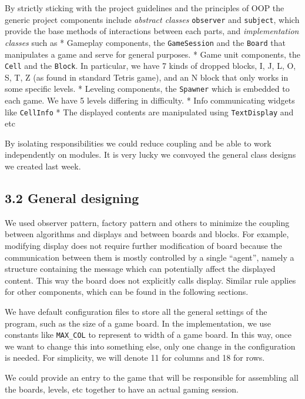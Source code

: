 \documentclass[
]{article}
\begin{document}
By strictly sticking with the project guidelines and the principles of
OOP the generic project components include \emph{abstract classes}
\texttt{observer} and \texttt{subject}, which provide the base methods
of interactions between each parts, and \emph{implementation classes}
such as * Gameplay components, the \texttt{GameSession} and the
\texttt{Board} that manipulates a game and serve for general purposes. *
Game unit components, the \texttt{Cell} and the \texttt{Block}. In
particular, we have 7 kinds of dropped blocks, I, J, L, O, S, T, Z (as
found in standard Tetris game), and an N block that only works in some
specific levels. * Leveling components, the \texttt{Spawner} which is
embedded to each game. We have 5 levels differing in difficulty. * Info
communicating widgets like \texttt{CellInfo} * The displayed contents
are manipulated using \texttt{TextDisplay} and etc

By isolating responsibilities we could reduce coupling and be able to
work independently on modules. It is very lucky we convoyed the general
class designs we created last week.

\hypertarget{general-designing}{%
\subsection{3.2 General designing}\label{general-designing}}

We used observer pattern, factory pattern and others to minimize the
coupling between algorithms and displays and between boards and blocks.
For example, modifying display does not require further modification of
board because the communication between them is mostly controlled by a
single ``agent'', namely a structure containing the message which can
potentially affect the displayed content. This way the board does not
explicitly calls display. Similar rule applies for other components,
which can be found in the following sections.

We have default configuration files to store all the general settings of
the program, such as the size of a game board. In the implementation, we
use constants like \texttt{MAX\_COL} to represent to width of a game
board. In this way, once we want to change this into something else,
only one change in the configuration is needed. For simplicity, we will
denote 11 for columns and 18 for rows.

We could provide an entry to the game that will be responsible for
assembling all the boards, levels, etc together to have an actual gaming
session.
\end{document}
